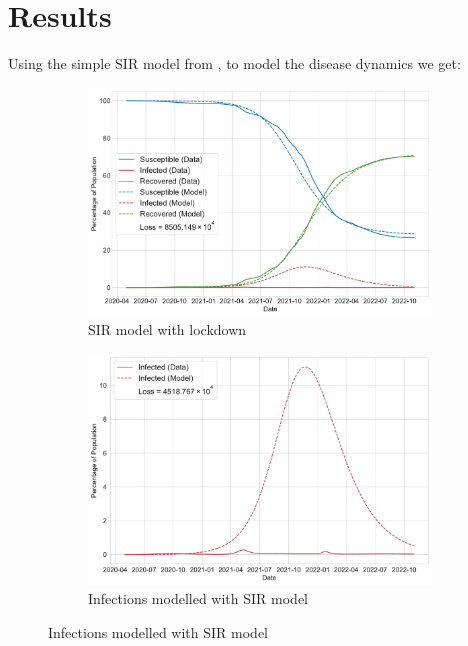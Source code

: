 \documentclass[tikz,fleqn,12pt]{wlscirep}
\begin{document}
\section{Results}
Using the simple SIR model from ,  to model the disease dynamics we get:
\begin{figure}[htbp!]
  \centering
  \caption{SIR Model with lockdown for India}
  \begin{subfigure}[t]{\textwidth}
    \centering
    \includegraphics[scale=0.5]{images/SIR_model_IND.pdf}
    \caption{SIR model with lockdown}
    \label{fig:SIR_model_IND}
  \end{subfigure}
  \begin{subfigure}[t]{\textwidth}
    \centering
    \includegraphics[scale=0.50]{images/SIR_model_infections_IND.pdf}
    \caption{Infections modelled with SIR model}
    \label{fig:SIR_model_infections_IND}
  \end{subfigure}
\end{figure}
\end{document}
